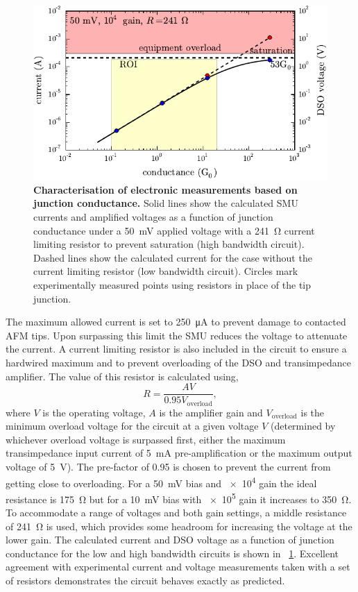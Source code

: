 \documentclass{article}
\begin{document}
\begin{figure}[bt]
\centering
\includegraphics{figures/hb_electronics_limits}
\caption[Characterisation of electronic measurements based on junction conductance.]{\textbf{Characterisation of electronic measurements based on junction conductance.} Solid lines show the calculated SMU currents and amplified voltages as a function of junction conductance under a \SI{50}{mV} applied voltage with a \SI{241}{\ohm} current limiting resistor to prevent saturation (high bandwidth circuit). Dashed lines show the calculated current for the case without the current limiting resistor (low bandwidth circuit). Circles mark experimentally measured points using resistors in place of the tip junction.}
\label{fig:hb_electronics_limits}
\end{figure}

The maximum allowed current is set to \SI{250}{\micro\ampere} to prevent damage to contacted AFM tips. Upon surpassing this limit the SMU reduces the voltage to attenuate the current. A current limiting resistor is also included in the circuit to ensure a hardwired maximum and to prevent overloading of the DSO and transimpedance amplifier. The value of this resistor is calculated using,
\begin{equation}
	R = \frac{AV}{0.95V_{\mathrm{overload}}},
\end{equation}
where $V$ is the operating voltage, $A$ is the amplifier gain and $V_{\mathrm{overload}}$ is the minimum overload voltage for the circuit at a given voltage $V$ (determined by whichever overload voltage is surpassed first, either the maximum transimpedance input current of \SI{5}{mA} pre-amplification or the maximum output voltage of \SI{5}{V}). The pre-factor of 0.95 is chosen to prevent the current from getting close to overloading. For a \SI{50}{mV} bias and \num{e4} gain the ideal resistance is \SI{175}{\ohm} but for a \SI{10}{mV} bias with \num{e5} gain it increases to \SI{350}{\ohm}. To accommodate a range of voltages and both gain settings, a middle resistance of \SI{241}{\ohm} is used, which provides some headroom for increasing the voltage at the lower gain. The calculated current and DSO voltage as a function of junction conductance for the low and high bandwidth circuits is shown in \figurename~\ref{fig:hb_electronics_limits}. Excellent agreement with experimental current and voltage measurements taken with a set of resistors demonstrates the circuit behaves exactly as predicted.
\end{document}
